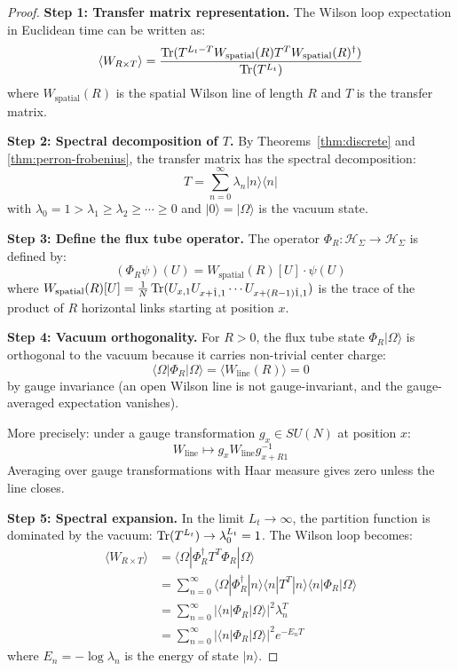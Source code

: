 \begin{proof}
\textbf{Step 1: Transfer matrix representation.}
The Wilson loop expectation in Euclidean time can be written as:
\[
\langle W_{R \times T} \rangle = \frac{\operatorname{Tr}(T^{L_t - T} W_{\text{spatial}}(R) T^T W_{\text{spatial}}(R)^\dagger)}{\operatorname{Tr}(T^{L_t})}
\]
where $W_{\text{spatial}}(R)$ is the spatial Wilson line of length $R$ and 
$T$ is the transfer matrix.

\textbf{Step 2: Spectral decomposition of $T$.}
By Theorems~\ref{thm:discrete} and \ref{thm:perron-frobenius}, the transfer 
matrix has the spectral decomposition:
\[
T = \sum_{n=0}^\infty \lambda_n |n\rangle\langle n|
\]
with $\lambda_0 = 1 > \lambda_1 \geq \lambda_2 \geq \cdots \geq 0$ and 
$|0\rangle = |\Omega\rangle$ is the vacuum state.

\textbf{Step 3: Define the flux tube operator.}
The operator $\Phi_R : \mathcal{H}_\Sigma \to \mathcal{H}_\Sigma$ is defined by:
\[
(\Phi_R \psi)(U) = W_{\text{spatial}}(R)[U] \cdot \psi(U)
\]
where $W_{\text{spatial}}(R)[U] = \frac{1}{N}\operatorname{Tr}(U_{x,1}U_{x+\hat{1},1}\cdots U_{x+(R-1)\hat{1},1})$ 
is the trace of the product of $R$ horizontal links starting at position $x$.

\textbf{Step 4: Vacuum orthogonality.}
For $R > 0$, the flux tube state $\Phi_R|\Omega\rangle$ is orthogonal to the 
vacuum because it carries non-trivial center charge:
\[
\langle \Omega | \Phi_R | \Omega \rangle = \langle W_{\text{line}}(R) \rangle = 0
\]
by gauge invariance (an open Wilson line is not gauge-invariant, and the 
gauge-averaged expectation vanishes).

More precisely: under a gauge transformation $g_x \in SU(N)$ at position $x$:
\[
W_{\text{line}} \mapsto g_x W_{\text{line}} g_{x+R\hat{1}}^{-1}
\]
Averaging over gauge transformations with Haar measure gives zero unless 
the line closes.

\textbf{Step 5: Spectral expansion.}
In the limit $L_t \to \infty$, the partition function is dominated by the 
vacuum: $\operatorname{Tr}(T^{L_t}) \to \lambda_0^{L_t} = 1$. The Wilson loop becomes:
\begin{align*}
\langle W_{R \times T} \rangle &= \langle \Omega | \Phi_R^\dagger T^T \Phi_R | \Omega \rangle \\
&= \sum_{n=0}^\infty \langle \Omega | \Phi_R^\dagger | n \rangle \langle n | T^T | n \rangle \langle n | \Phi_R | \Omega \rangle \\
&= \sum_{n=0}^\infty |\langle n | \Phi_R | \Omega \rangle|^2 \lambda_n^T \\
&= \sum_{n=0}^\infty |\langle n | \Phi_R | \Omega \rangle|^2 e^{-E_n T}
\end{align*}
where $E_n = -\log\lambda_n$ is the energy of state $|n\rangle$.
\end{proof}

